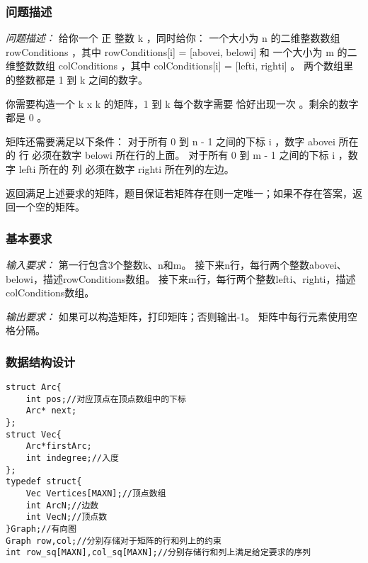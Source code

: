 \documentclass[a4paper,11pt]{article}%
\newenvironment{shadedquotation}
 {\begin{shaded*}
  \quoting[leftmargin=0pt, vskip=0pt]
 }
 {\endquoting
 \end{shaded*}
}
\begin{document}
\subsubsection{问题描述}
\begin{shadedquotation}
    \emph{问题描述：}
    给你一个 正 整数 k ，同时给你：
一个大小为 n 的二维整数数组 rowConditions ，其中 rowConditions[i] = [abovei, belowi] 和
一个大小为 m 的二维整数数组 colConditions ，其中 colConditions[i] = [lefti, righti] 。
两个数组里的整数都是 1 到 k 之间的数字。

你需要构造一个 k x k 的矩阵，1 到 k 每个数字需要 恰好出现一次 。剩余的数字都是 0 。

矩阵还需要满足以下条件：
对于所有 0 到 n - 1 之间的下标 i ，数字 abovei 所在的 行 必须在数字 belowi 所在行的上面。
对于所有 0 到 m - 1 之间的下标 i ，数字 lefti 所在的 列 必须在数字 righti 所在列的左边。

返回满足上述要求的矩阵，题目保证若矩阵存在则一定唯一；如果不存在答案，返回一个空的矩阵。
\end{shadedquotation}
\subsubsection{基本要求}
\begin{shadedquotation}
    \emph{输入要求：}
    第一行包含3个整数k、n和m。
    接下来n行，每行两个整数abovei、belowi，描述rowConditions数组。
    接下来m行，每行两个整数lefti、righti，描述colConditions数组。
\end{shadedquotation}
\begin{shadedquotation}
    \emph{输出要求：}
    如果可以构造矩阵，打印矩阵；否则输出-1。
矩阵中每行元素使用空格分隔。
\end{shadedquotation}
\subsubsection{数据结构设计}
\begin{lstlisting}[language={[ANSI]C},keywordstyle=\color{blue!70},commentstyle=\color{red!50!green!50!blue!50},frame=shadowbox,
				rulesepcolor=\color{red!20!green!20!blue!20}]
struct Arc{
	int pos;//对应顶点在顶点数组中的下标
	Arc* next;
};
struct Vec{
	Arc*firstArc;
	int indegree;//入度
};
typedef struct{
	Vec Vertices[MAXN];//顶点数组
	int ArcN;//边数
	int VecN;//顶点数
}Graph;//有向图
Graph row,col;//分别存储对于矩阵的行和列上的约束
int row_sq[MAXN],col_sq[MAXN];//分别存储行和列上满足给定要求的序列
\end{lstlisting}
\end{document}
